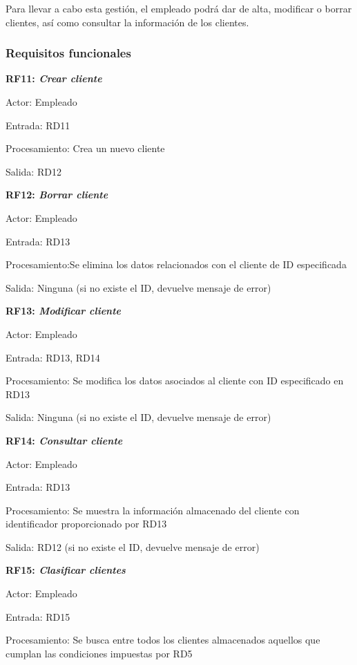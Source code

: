 \documentclass[paper=a4, fontsize=11pt, spanish]{scrartcl}
\begin{document}
Para llevar a cabo esta gestión, el empleado podrá dar de alta, modificar o borrar clientes, así como consultar la información de los clientes.

\subsubsection{Requisitos funcionales}
\setlength{\parindent}{0em}
\textbf{RF11: \textit{Crear cliente}}
\setlength{\parindent}{2em}

Actor: Empleado

Entrada: RD11

Procesamiento: Crea un nuevo cliente

Salida: RD12

\setlength{\parindent}{0em}
\textbf{RF12: \textit{Borrar cliente}}
\setlength{\parindent}{2em}

Actor: Empleado

Entrada: RD13

Procesamiento:Se elimina los datos relacionados con el cliente de ID especificada

Salida: Ninguna (si no existe el ID, devuelve mensaje de error)

\setlength{\parindent}{0em}
\textbf{RF13: \textit{Modificar cliente}}
\setlength{\parindent}{2em}

Actor: Empleado

Entrada: RD13, RD14

Procesamiento: Se modifica los datos asociados al cliente con ID especificado en RD13

Salida: Ninguna (si no existe el ID, devuelve mensaje de error)

\setlength{\parindent}{0em}
\textbf{RF14: \textit{Consultar cliente}}
\setlength{\parindent}{2em}

Actor: Empleado

Entrada: RD13

Procesamiento: Se muestra la información almacenado del cliente con identificador proporcionado por RD13

Salida:  RD12 (si no existe el ID, devuelve mensaje de error)

\setlength{\parindent}{0em}
\textbf{RF15: \textit{Clasificar clientes}}
\setlength{\parindent}{2em}

Actor: Empleado

Entrada: RD15

Procesamiento:  Se busca entre todos los clientes almacenados aquellos que cumplan las condiciones impuestas por RD5
\end{document}
